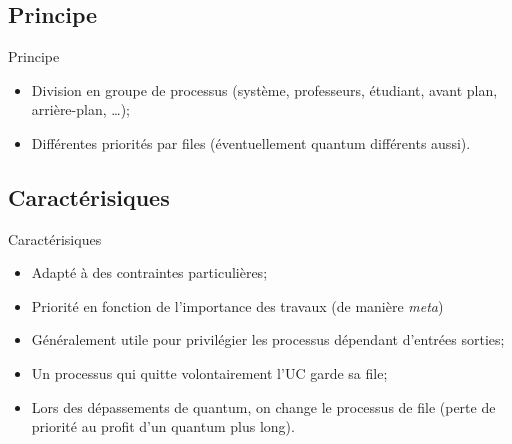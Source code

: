 \section{\sectitle}
\begin{frame}{\sectitle}
\def\subsectitle{Principe}
\subsection{\subsectitle}

\begin{block}{\subsectitle}
\begin{itemize}
    \item Division en groupe de processus (système, professeurs, étudiant, avant
    plan, arrière-plan, \dots);
    \item Différentes priorités par files (éventuellement quantum différents
    aussi).
\end{itemize}
\end{block}


\def\subsectitle{Caractérisiques}
\subsection{\subsectitle}
\begin{block}{\subsectitle}
\begin{itemize}
    \item Adapté à des contraintes particulières;
    \item Priorité en fonction de l'importance des travaux (de manière
    \textit{meta})
    \item Généralement utile pour privilégier les processus dépendant d'entrées
    sorties;
    \item Un processus qui quitte volontairement l'UC garde sa file;
    \item Lors des dépassements de quantum, on change le processus de file
    (perte de priorité au profit d'un quantum plus long).
\end{itemize}
\end{block}

\end{frame}

